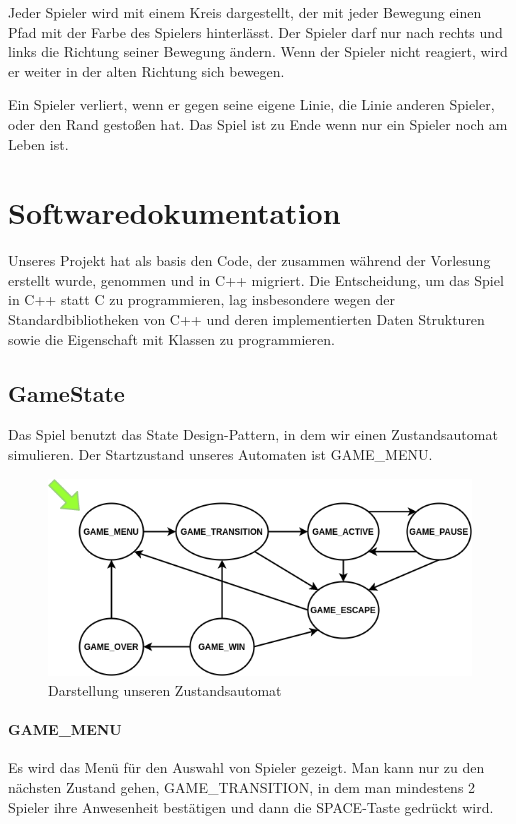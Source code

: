 \documentclass[doktyp=studarbeit]{TUBAFarbeiten}
\begin{document}
Jeder Spieler wird mit einem Kreis dargestellt, der mit jeder Bewegung einen 
Pfad mit der Farbe des Spielers hinterlässt. Der Spieler darf nur nach rechts 
und links die Richtung seiner Bewegung ändern. Wenn der Spieler nicht reagiert, 
wird er weiter in der alten Richtung sich bewegen.

Ein Spieler verliert, wenn er gegen seine eigene Linie, die Linie anderen 
Spieler,  oder den Rand gestoßen hat. Das Spiel ist zu Ende wenn nur ein 
Spieler noch am Leben ist.

\section{Softwaredokumentation}

Unseres Projekt hat als basis den Code, der zusammen während der Vorlesung 
erstellt wurde, genommen und in C++ migriert. 
Die Entscheidung, um das Spiel in C++ statt C zu programmieren, lag 
insbesondere wegen der Standardbibliotheken von C++ und deren implementierten 
Daten Strukturen sowie die Eigenschaft mit Klassen zu programmieren.

\subsection{GameState}

Das Spiel benutzt das State Design-Pattern, in dem wir einen Zustandsautomat
simulieren. Der Startzustand unseres Automaten ist GAME\_MENU. 

\begin{figure}
    \centering
    \includegraphics[width=0.7\linewidth]{state_machine.png}
	\caption{Darstellung unseren Zustandsautomat}
	\label{fig:state-machine}
\end{figure}

\paragraph{GAME\_MENU}
Es wird das Menü für den Auswahl von Spieler gezeigt. Man kann nur zu den
nächsten Zustand gehen, GAME\_TRANSITION, in dem man mindestens 2 Spieler
ihre Anwesenheit bestätigen und dann die SPACE-Taste gedrückt wird.
\end{document}
